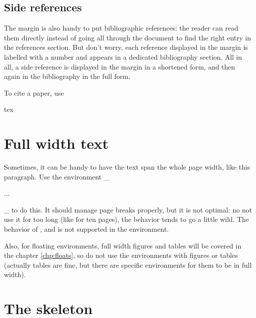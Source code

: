 \documentclass[
    11pt,
]{tufte-style-thesis}
\begin{document}
\subsection{Side references}

The margin is also handy to put bibliographic references: the reader can read them directly instead of going all through the document to find the right entry in the references section. But don't worry, each reference displayed in the margin is labelled with a number and appears in a dedicated bibliography section. All in all, a side reference is displayed in the margin in a shortened form, and then again in the bibliography in the full form.

To cite a paper, use
\begin{codebox}{tex}
\end{codebox}

\section{Full width text}

\begin{wide}
Sometimes, it can be handy to have the text span the whole page width, like this paragraph. Use the environment _\begin{wide}...\end{wide}_ to do this. It should manage page breaks properly, but it is not optimal: no not use it for too long (like for ten pages), the behavior tends to go a little wild. The behavior of ,  and  is not supported in the  environment.

Also, for floating environments, full width figures and tables will be covered in the chapter \ref{chp:floats}, so do not use the  environments with figures or tables (actually tables are fine, but there are specific environments for them to be in full width).
\end{wide}

\section{The skeleton}
\end{document}
